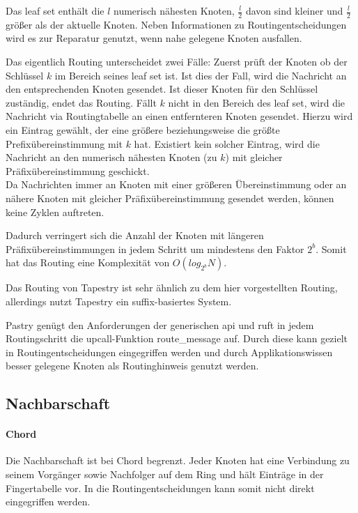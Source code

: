 Das leaf set enthält die $l$ numerisch nähesten Knoten, $\frac{l}{2}$ davon sind kleiner und $\frac{l}{2}$ größer als der aktuelle Knoten. Neben Informationen zu Routingentscheidungen wird es zur Reparatur genutzt, wenn nahe gelegene Knoten ausfallen.

Das eigentlich Routing unterscheidet zwei Fälle: Zuerst prüft der Knoten ob der Schlüssel $k$ im Bereich seines leaf set ist. Ist dies der Fall, wird die Nachricht an den entsprechenden Knoten gesendet. Ist dieser Knoten für den Schlüssel zuständig, endet das Routing. Fällt $k$ nicht in den Bereich des leaf set, wird die Nachricht via Routingtabelle an einen entfernteren Knoten gesendet. Hierzu wird ein Eintrag gewählt, der eine größere beziehungsweise die größte Prefixübereinstimmung mit $k$ hat. Existiert kein solcher Eintrag, wird die Nachricht an den numerisch nähesten Knoten (zu $k$) mit gleicher Präfixübereinstimmung geschickt.\\
Da Nachrichten immer an Knoten mit einer größeren Übereinstimmung oder an nähere Knoten mit gleicher Präfixübereinstimmung gesendet werden, können keine Zyklen auftreten.

Dadurch verringert sich die Anzahl der Knoten mit längeren Präfixübereinstimmungen in jedem Schritt um mindestens den Faktor $2^b$. Somit hat das Routing eine Komplexität von $O(log_{2^b} N)$.

Das Routing von Tapestry ist sehr ähnlich zu dem hier vorgestellten Routing, allerdings nutzt Tapestry ein suffix-basiertes System.

Pastry genügt den Anforderungen der generischen \ac{api} und ruft in jedem Routingschritt die upcall-Funktion route\_message auf. Durch diese kann gezielt in Routingentscheidungen eingegriffen werden und durch Applikationswissen besser gelegene Knoten als Routinghinweis genutzt werden.

\subsection{Nachbarschaft}
\paragraph{Chord}
Die Nachbarschaft ist bei Chord begrenzt. Jeder Knoten hat eine Verbindung zu seinem Vorgänger sowie Nachfolger auf dem Ring und hält Einträge in der Fingertabelle vor. In die Routingentscheidungen kann somit nicht direkt eingegriffen werden.


